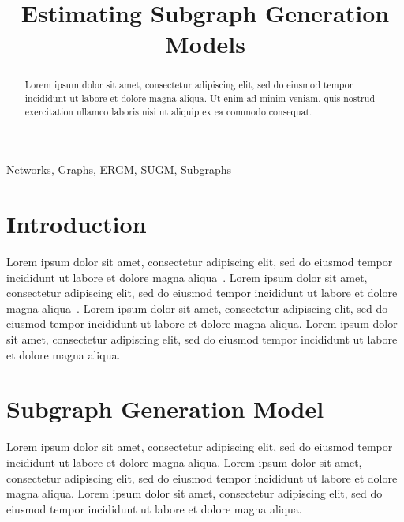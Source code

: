 \documentclass[conference]{IEEEtran}
\begin{document}
\title{Estimating Subgraph Generation Models}

\author{
\and
{}
}

\maketitle

\begin{abstract}
Lorem ipsum dolor sit amet, consectetur adipiscing elit, sed do eiusmod tempor incididunt ut labore et dolore magna aliqua. Ut enim ad minim veniam, quis nostrud exercitation ullamco laboris nisi ut aliquip ex ea commodo consequat.
\end{abstract}

\begin{IEEEkeywords}
Networks, Graphs, ERGM, SUGM, Subgraphs
\end{IEEEkeywords}

\section{Introduction}

Lorem ipsum dolor sit amet, consectetur adipiscing elit, sed do eiusmod tempor incididunt ut labore et dolore magna aliqua~\cite{Chandrasekhar2014}.
Lorem ipsum dolor sit amet, consectetur adipiscing elit, sed do eiusmod tempor incididunt ut labore et dolore magna aliqua~\cite{Davis1972}.
Lorem ipsum dolor sit amet, consectetur adipiscing elit, sed do eiusmod tempor incididunt ut labore et dolore magna aliqua.
Lorem ipsum dolor sit amet, consectetur adipiscing elit, sed do eiusmod tempor incididunt ut labore et dolore magna aliqua.

\section{Subgraph Generation Model}

Lorem ipsum dolor sit amet, consectetur adipiscing elit, sed do eiusmod tempor incididunt ut labore et dolore magna aliqua.
Lorem ipsum dolor sit amet, consectetur adipiscing elit, sed do eiusmod tempor incididunt ut labore et dolore magna aliqua.
Lorem ipsum dolor sit amet, consectetur adipiscing elit, sed do eiusmod tempor incididunt ut labore et dolore magna aliqua.
\end{document}

